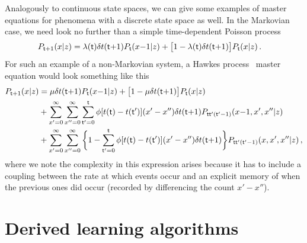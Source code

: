 Analogously to continuous state spaces, we can give some examples of master equations for phenomena with a discrete state space as well. In the Markovian case, we need look no further than a simple time-dependent Poisson process
\begin{align}
P_{{\sf t}+1}(x\vert z) &= \lambda ({\sf t}) \delta t({\sf t}{+}1)P_{{\sf t}}(x{-}1\vert z) + \big[1-\lambda ({\sf t}) \delta t({\sf t}{+}1)\big] P_{{\sf t}}(x\vert z) \,.
\end{align}
For such an example of a non-Markovian system, a Hawkes process~\cite{hawkes1971spectra} master equation would look something like this
\begin{align}
P_{{\sf t}+1}(x\vert z) &= \mu \delta t({\sf t}{+}1)P_{{\sf t}}(x{-}1\vert z) + \big[ 1-\mu \delta t({\sf t}{+}1)\big] P_{{\sf t}}(x\vert z) \nonumber \\
& + \sum_{x'=0}^\infty\sum_{x''=0}^\infty\sum_{{\sf t}'=0}^{{\sf t}} \phi [t({\sf t})-t({\sf t}')] (x'-x'') \delta t({\sf t}{+}1)P_{{\sf t}{\sf t}'({\sf t}'-1)}(x{-}1,x',x''\vert z) \nonumber \\
&+ \sum_{x'=0}^\infty\sum_{x''=0}^\infty\bigg\lbrace 1-\sum_{{\sf t}'=0}^{{\sf t}} \phi [t({\sf t})-t({\sf t}')] (x'-x'') \delta t({\sf t}{+}1)\bigg\rbrace P_{{\sf t}{\sf t}'({\sf t}'-1)}(x, x', x''\vert z) \,,
\end{align}
where we note the complexity in this expression arises because it has to include a coupling between the rate at which events occur and an explicit memory of when the previous ones did occur (recorded by differencing the count $x'-x''$).

\section{\sffamily Derived learning algorithms}

